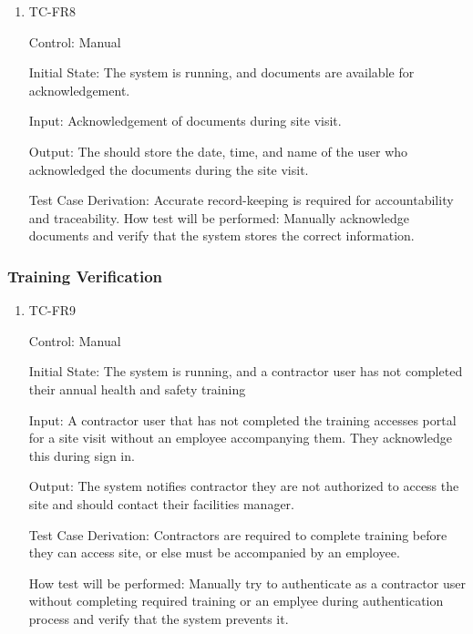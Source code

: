 \documentclass[12pt, titlepage]{article}
\begin{document}
\begin{enumerate}
  \item {TC-FR8\\}

    Control: Manual

    Initial State: The system is running, and documents are available for
    acknowledgement.

    Input: Acknowledgement of documents during site visit.

    Output: The should store the date, time, and name of the
    user who acknowledged the documents during the site visit.

    Test Case Derivation: Accurate record-keeping is required for
    accountability and traceability.
    How test will be performed: Manually acknowledge documents and verify that
    the system stores the correct information.

\end{enumerate}

\subsubsection{Training Verification}

\begin{enumerate}
  \item {TC-FR9\\}

    Control: Manual

    Initial State: The system is running, and a contractor user has not completed their annual health and safety training

    Input: A contractor user that has not completed the training accesses portal for a site visit
    without an employee accompanying them. They acknowledge this during sign in.

    Output: The system notifies contractor they are not authorized to access the site and should contact their facilities manager.

    Test Case Derivation: Contractors are required to complete training before
    they can access site, or else must be accompanied by an employee.

    How test will be performed: Manually try to authenticate
    as a contractor user without completing required training or an emplyee during authentication process and verify that
    the system prevents it.

\end{enumerate}
\end{document}
